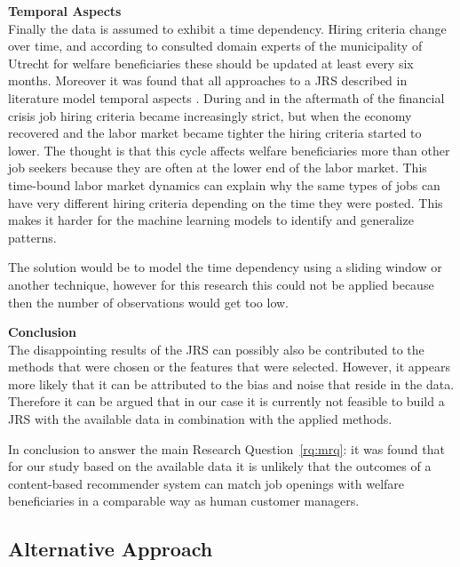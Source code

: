 \noindent
\textbf{Temporal Aspects} \\
Finally the data is assumed to exhibit a time dependency.
Hiring criteria change over time, and according to consulted domain experts of the municipality of Utrecht for welfare beneficiaries these should be updated at least every six months. 
Moreover it was found that all approaches to a JRS described in literature model temporal aspects  \cite{kenthapadi2017personalized, T.Al-Otaibi2012ASystems, Zheng2012JobSurvey, hong2013job}.
During and in the aftermath of the financial crisis job hiring criteria became increasingly strict, but when the economy recovered and the labor market became tighter the hiring criteria started to lower. 
The thought is that this cycle affects welfare beneficiaries more than other job seekers because they are often at the lower end of the labor market.
This time-bound labor market dynamics can explain why the same types of jobs can have very different hiring criteria depending on the time they were posted.
This makes it harder for the machine learning models to identify and generalize patterns.

The solution would be to model the time dependency using a sliding window or another technique, however for this research this could not be applied because then the number of observations would get too low.  

\noindent
\textbf{Conclusion}\\
The disappointing results of the JRS can possibly also be contributed to the methods that were chosen or the features that were selected. 
However, it appears more likely that it can be attributed to the bias and noise that reside in the data.
Therefore it can be argued that in our case it is currently not feasible to build a JRS with the available data in combination with the applied methods. 

In conclusion to answer the main Research Question~\ref{rq:mrq}: it was found that for our study based on the available data it is unlikely that the outcomes of a content-based recommender system can match job openings with welfare beneficiaries in a comparable way as human customer managers. 

\subsection{Alternative Approach}
\label{ssec:learnings}

